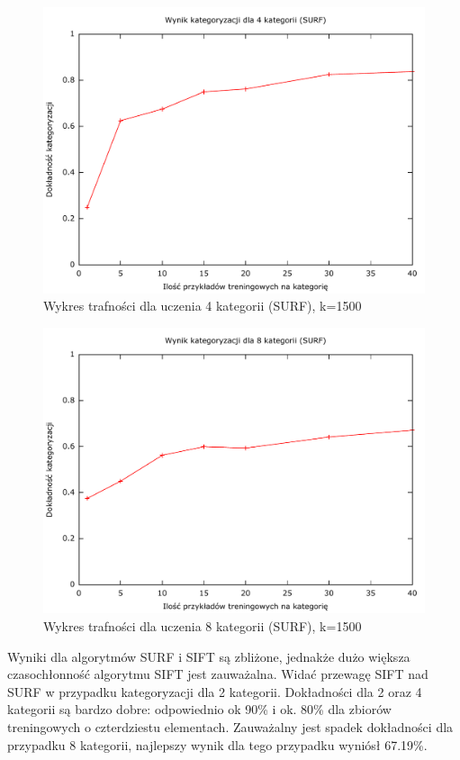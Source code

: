 \begin{figure}[h]
	\centering
	\includegraphics[scale=0.8]{graphics/04_interpretacja_wynikow/result-surf-4.pdf}
	\caption{ Wykres trafności dla uczenia 4 kategorii (SURF), k=1500 }
	\label{fig:result-surf-4}
\end{figure}

\begin{figure}[h]
	\centering
	\includegraphics[scale=0.8]{graphics/04_interpretacja_wynikow/result-surf-8.pdf}
	\caption{ Wykres trafności dla uczenia 8 kategorii (SURF), k=1500 }
	\label{fig:result-surf-8}
\end{figure}

Wyniki dla algorytmów SURF i SIFT są zbliżone, jednakże dużo większa czasochłonność algorytmu SIFT jest zauważalna. Widać przewagę SIFT nad SURF w przypadku kategoryzacji dla 2 kategorii. Dokładności dla 2 oraz 4 kategorii są bardzo dobre: odpowiednio ok 90\% i ok. 80\% dla zbiorów treningowych o czterdziestu elementach. Zauważalny jest spadek dokładności dla przypadku 8 kategorii, najlepszy wynik dla tego przypadku wyniósł 67.19\%. 

